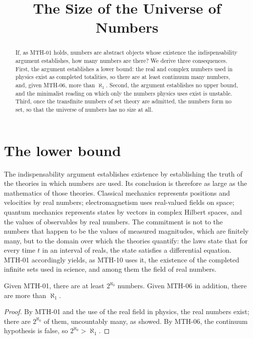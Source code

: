\documentclass{situationist-preprint}
\title{The Size of the Universe of Numbers}
\begin{document}
\maketitle

\begin{abstract}
If, as MTH-01 holds, numbers are abstract objects whose existence the indispensability argument establishes, how many numbers are there? We derive three consequences. First, the argument establishes a lower bound: the real and complex numbers used in physics exist as completed totalities, so there are at least continuum many numbers, and, given MTH-06, more than $\aleph_1$. Second, the argument establishes no upper bound, and the minimalist reading on which only the numbers physics uses exist is unstable. Third, once the transfinite numbers of set theory are admitted, the numbers form no set, so that the universe of numbers has no size at all.
\end{abstract}

\section{The lower bound}\label{s:lower}

The indispensability argument establishes existence by establishing the truth of the theories in which numbers are used. Its conclusion is therefore as large as the mathematics of those theories. Classical mechanics represents positions and velocities by real numbers; electromagnetism uses real-valued fields on space; quantum mechanics represents states by vectors in complex Hilbert spaces, and the values of observables by real numbers. The commitment is not to the numbers that happen to be the values of measured magnitudes, which are finitely many, but to the domain over which the theories quantify: the laws state that for every time $t$ in an interval of reals, the state satisfies a differential equation. MTH-01 accordingly yields, as MTH-10 uses it, the existence of the completed infinite sets used in science, and among them the field of real numbers.

\begin{proposition}\label{p:lower}
Given MTH-01, there are at least $2^{\aleph_0}$ numbers. Given MTH-06 in addition, there are more than $\aleph_1$.
\end{proposition}

\begin{proof}
By MTH-01 and the use of the real field in physics, the real numbers exist; there are $2^{\aleph_0}$ of them, uncountably many, as \citet{Cantor1874} showed. By MTH-06, the continuum hypothesis is false, so $2^{\aleph_0} > \aleph_1$.
\end{proof}
\end{document}
